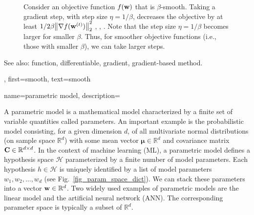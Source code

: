 {{{\begin{figure}[H]
\begin{center}
	    	\end{center}
	    	\caption{Consider an objective function $f({\bf w})$ that is $\beta$-smooth. 
	    		Taking a gradient step, with step size $\eta = 1/\beta$, decreases the 
	    		objective by at least ${1}/{2\beta}\mleft\lVert \nabla f({\bf w}^{(t)}) \mright\rVert_{2}^{2}$ \cite{nesterov04}, \cite{CvxBubeck2015}, \cite{CvxAlgBertsekas}. 
	    		Note that the step size $\eta = 1/\beta$ becomes larger for smaller $\beta$. Thus, 
	    		for smoother objective functions (i.e., those with smaller $\beta$), 
				we can take larger steps. \label{fig_gd_smooth_dict}}
	    	\end{figure}
		See also: function, differentiable, gradient,  gradient-based method.},
	first={smooth},
	text={smooth}
}

{name={parametric model},
	description={
		A parametric model is a mathematical model characterized 
		by a finite set of variable quantities called parameters.
		An important example is the probabilistic model consisting, for a given 
		dimension $d$, of all multivariate normal distributions (on sample space 
		$\mathbb{R}^{d}$) with some mean vector 
		${\bm \mu} \in \mathbb{R}^{d}$ and covariance matrix ${\bf C} \in \mathbb{R}^{d \times d}$.
        In the context of machine learning (ML), a parametric model defines a 
		hypothesis space $\mathcal{H}$ parameterized by a finite number of model parameters.
        Each hypothesis $h \in \mathcal{H}$ is uniquely identified by a 
		list of model parameters $w_{1}, w_{2}, \ldots, w_{d}$ 
		(see Fig.~\ref{fig_param_space_dict}). We can stack these parameters into a 
		vector ${\bf w} \in \mathbb{R}^{d}$. Two widely used examples 
		of parametric models are the linear model and the artificial neural network (ANN). The 
		corresponding parameter space is typically a subset of $\mathbb{R}^{d}$.
		\begin{figure}[H]
			\begin{center}
\end{center}
\end{figure}}}}

